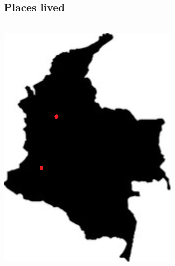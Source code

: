 \documentclass[american]{cv-class}
\begin{document}
\begin{aside}
	\section{Places lived}
	\\
	\includegraphics[scale=0.42]{img/colombia-logo.png}
	~
\end{aside}
\end{document}
